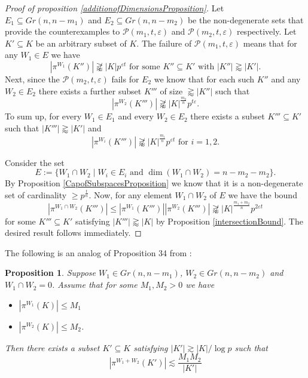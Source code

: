 \documentclass{amsart}
\newtheorem{proposition}[theorem]{Proposition}
\begin{document}
\begin{proof}[Proof of proposition \ref{additionofDimensionsProposition}]
    Let $E_1 \subseteq Gr(n, n - m_1)$ and $E_2 \subseteq Gr(n, n - m_2)$ be the non-degenerate sets that provide the counterexamples to $\mathcal{P}(m_1, t, \varepsilon)$ and $\mathcal{P}(m_2, t, \varepsilon)$ respectively. Let  $K' \subseteq K$ be an arbitrary subset of $K$. The failure of $\mathcal{P}(m_1, t, \varepsilon)$ means that for any $W_1 \in E$ we have 
    $$|\pi^{W_1}(K'')| \not \gtrapprox |K|p^{\varepsilon t} \text{ for some } K'' \subseteq K' \text{ with }|K''| \gtrapprox |K'|.$$ 
    Next, since the $\mathcal{P}(m_2, t, \varepsilon)$ fails for $E_2$ we know that for each such $K''$ and any $W_2 \in E_2$ there exists a further subset $K'''$ of size $\gtrapprox|K''|$ such that $$|\pi^{W_2}(K''')| \not \gtrapprox |K|^\frac{m_2}{n}p^{t \varepsilon}.$$ 
    To sum up, for every $W_1 \in E_1$ and every $W_2 \in E_2$ there exists a subset $K''' \subseteq K'$ such that $|K'''| \gtrapprox|K'|$ and $$|\pi^{W_i}(K''')| \not \gtrapprox |K|^\frac{m_i}{n}p^{\varepsilon t} \text{ for } i = 1, 2.$$
    
    Consider the set $$E := \{W_1 \cap W_2 \mid W_i \in E_i \text{ and } \dim(W_1 \cap W_2) = n - m_2 - m_2\}.$$ By Proposition \ref{CapofSubspacesProposition} we know that it is a non-degenerate set of cardinality $\geq p^{\frac{t}{n}}$. Now, for any element $W_1 \cap W_2$ of $E$ we have the bound $$|\pi^{W_1 \cap W_2}(K''')| \leq |\pi^{W_1}(K''')| |\pi^{W_2}(K''')| \not \gtrapprox |K|^\frac{m_1 + m_2}{n}p^{2 \varepsilon t}$$ for some $K''' \subseteq K'$ satisfying $|K'''| \gtrapprox|K|$ by Proposition \ref{intersectionBound}. The desired result follows immediately.
\end{proof}

The following is an analog of Proposition 34 from \cite{He18}:

\begin{proposition}\label{sumBound}
Suppose $W_1 \in Gr(n, n - m_1)$, $W_2 \in Gr(n, n - m_2)$ and $W_1 \cap W_2 = 0$. Assume that for some $M_1, M_2 > 0$ we have
\begin{itemize}
    \item $|\pi^{W_1}(K)| \leq   M_1$
    \item $|\pi^{W_2}(K)| \leq M_2$.
\end{itemize}
Then there exists a subset $K' \subseteq K$ satisfying $|K'| \gtrsim |K| / \log p$ such that $$|\pi^{W_1 + W_2}(K')| \lesssim \frac{M_1 M_2}{|K'|} $$
\end{proposition}
\end{document}
